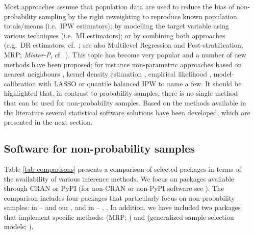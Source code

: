 \documentclass[
]{jss}
\begin{document}
Most approaches assume that population data are used to reduce the bias
of non-probability sampling by the right reweighting to reproduce known
population totals/means (i.e.~IPW estimators); by modelling the target
variable using various techniques (i.e.~MI estimators); or by combining
both approaches (e.g.~DR estimators, cf.~\citet{chen2020doubly}; see
also Multilevel Regression and Post-stratification, MRP;
\textit{Mister-P}, cf.~\citet{gelman1997poststratification}). This topic
has become very popular and a number of new methods have been proposed;
for instance non-parametric approaches based on nearest neighbours
\citep{yang2021integration}, kernel density estimation
\citep{chen_nonparametric_2022}, empirical likelihood
\citep{kim2023empirical}, model-calibration with LASSO \citep{chen2018}
or quantile balanced IPW \citep{beresewicz2025} to name a few. It should
be highlighted that, in contrast to probability samples, there is no
single method that can be used for non-probability samples. Based on the
methods available in the literature several statistical software
solutions have been developed, which are presented in the next section.

\subsection{Software for non-probability samples}\label{sec-software}

Table \ref{tab-comparisons} presents a comparison of selected packages
in terms of the availability of various inference methods. We focus on
packages available through CRAN or PyPI (for non-CRAN or non-PyPI
software see \citet{cobo2024software}). The comparison includes four
packages that particularly focus on non-probability samples: in
 --  \citep{NonProbEst} and our
, and in  -- 
\citep{sarig2023balancepythonpackage}, 
\citep{castro2024inps}. In addition, we have included two 
packages that implement specific methods:  (MRP;
\citet{rstanarm}) and  (generalized sample selection models;
\citet{GJRM}).
\end{document}
